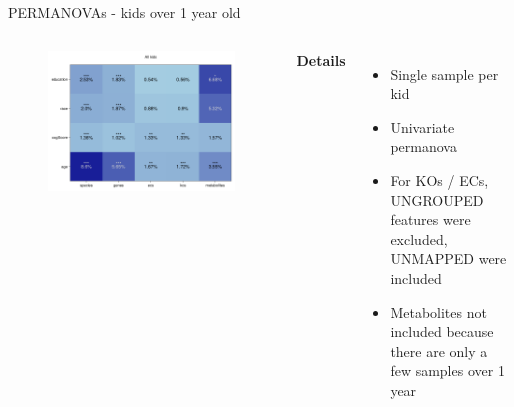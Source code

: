 \begin{frame}{PERMANOVAs - kids over 1 year old}
    \begin{columns}[c] %

    
        \begin{figure}
        \includegraphics[width=1\linewidth]{../figures/kids_all_permanovas.png}
        \end{figure}

    
        \textbf{Details}
        \begin{itemize}
            \item Single sample per kid
            \item Univariate permanova
            \item For KOs / ECs, UNGROUPED features were excluded, UNMAPPED were included
            \item Metabolites not included because there are only a few samples over 1 year
        \end{itemize}

    \end{columns}

\end{frame}


